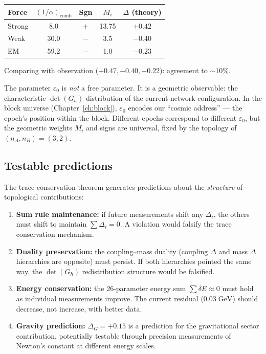 \begin{center}
\begin{tabular}{lcccc}
\hline
Force & $(1/\alpha)_\text{comb}$ & Sgn & $M_i$ & $\Delta$ (theory) \\
\hline
Strong & 8.0 & $+$ & 13.75 & $+0.42$ \\
Weak & 30.0 & $-$ & 3.5 & $-0.40$ \\
EM & 59.2 & $-$ & 1.0 & $-0.23$ \\
\hline
\end{tabular}
\end{center}

Comparing with observation ($+0.47, -0.40, -0.22$): agreement to $\sim 10\%$.

The parameter $\varepsilon_0$ is \emph{not} a free parameter. It is a geometric observable: the characteristic $\det(G_h)$ distribution of the current network configuration. In the block universe (Chapter~\ref{ch:block}), $\varepsilon_0$ encodes our ``cosmic address'' --- the epoch's position within the block. Different epochs correspond to different $\varepsilon_0$, but the geometric weights $M_i$ and signs are universal, fixed by the topology of $(n_A, n_B) = (3, 2)$.

\subsection{Testable predictions}

The trace conservation theorem generates predictions about the \emph{structure} of topological contributions:

\begin{enumerate}
\item \textbf{Sum rule maintenance:} if future measurements shift any $\Delta_i$, the others must shift to maintain $\sum \Delta_i = 0$. A violation would falsify the trace conservation mechanism.

\item \textbf{Duality preservation:} the coupling--mass duality (coupling $\Delta$ and mass $\Delta$ hierarchies are opposite) must persist. If both hierarchies pointed the same way, the $\det(G_h)$ redistribution structure would be falsified.

\item \textbf{Energy conservation:} the 26-parameter energy sum $\sum \delta E \approx 0$ must hold as individual measurements improve. The current residual ($0.03\;\text{GeV}$) should decrease, not increase, with better data.

\item \textbf{Gravity prediction:} $\Delta_G = +0.15$ is a prediction for the gravitational sector contribution, potentially testable through precision measurements of Newton's constant at different energy scales.
\end{enumerate}

